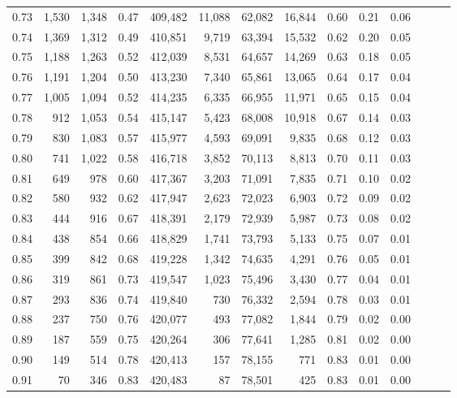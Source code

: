 \begin{tabular}{rrrrrrrrrrrrrr}
0.73 &  1,530 &  1,348 &  0.47 &  409,482 &   11,088 &  62,082 &  16,844 &  0.60 &  0.21 &      0.06 \\
0.74 &  1,369 &  1,312 &  0.49 &  410,851 &    9,719 &  63,394 &  15,532 &  0.62 &  0.20 &      0.05 \\
0.75 &  1,188 &  1,263 &  0.52 &  412,039 &    8,531 &  64,657 &  14,269 &  0.63 &  0.18 &      0.05 \\
0.76 &  1,191 &  1,204 &  0.50 &  413,230 &    7,340 &  65,861 &  13,065 &  0.64 &  0.17 &      0.04 \\
0.77 &  1,005 &  1,094 &  0.52 &  414,235 &    6,335 &  66,955 &  11,971 &  0.65 &  0.15 &      0.04 \\
0.78 &    912 &  1,053 &  0.54 &  415,147 &    5,423 &  68,008 &  10,918 &  0.67 &  0.14 &      0.03 \\
0.79 &    830 &  1,083 &  0.57 &  415,977 &    4,593 &  69,091 &   9,835 &  0.68 &  0.12 &      0.03 \\
0.80 &    741 &  1,022 &  0.58 &  416,718 &    3,852 &  70,113 &   8,813 &  0.70 &  0.11 &      0.03 \\
0.81 &    649 &    978 &  0.60 &  417,367 &    3,203 &  71,091 &   7,835 &  0.71 &  0.10 &      0.02 \\
0.82 &    580 &    932 &  0.62 &  417,947 &    2,623 &  72,023 &   6,903 &  0.72 &  0.09 &      0.02 \\
0.83 &    444 &    916 &  0.67 &  418,391 &    2,179 &  72,939 &   5,987 &  0.73 &  0.08 &      0.02 \\
0.84 &    438 &    854 &  0.66 &  418,829 &    1,741 &  73,793 &   5,133 &  0.75 &  0.07 &      0.01 \\
0.85 &    399 &    842 &  0.68 &  419,228 &    1,342 &  74,635 &   4,291 &  0.76 &  0.05 &      0.01 \\
0.86 &    319 &    861 &  0.73 &  419,547 &    1,023 &  75,496 &   3,430 &  0.77 &  0.04 &      0.01 \\
0.87 &    293 &    836 &  0.74 &  419,840 &      730 &  76,332 &   2,594 &  0.78 &  0.03 &      0.01 \\
0.88 &    237 &    750 &  0.76 &  420,077 &      493 &  77,082 &   1,844 &  0.79 &  0.02 &      0.00 \\
0.89 &    187 &    559 &  0.75 &  420,264 &      306 &  77,641 &   1,285 &  0.81 &  0.02 &      0.00 \\
0.90 &    149 &    514 &  0.78 &  420,413 &      157 &  78,155 &     771 &  0.83 &  0.01 &      0.00 \\
0.91 &     70 &    346 &  0.83 &  420,483 &       87 &  78,501 &     425 &  0.83 &  0.01 &      0.00 \\

\end{tabular}
